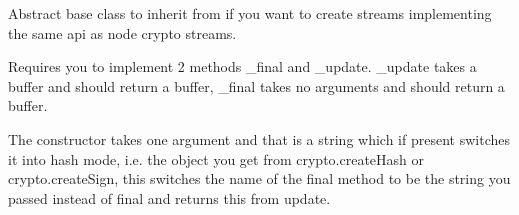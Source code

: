 \href{https://travis-ci.org/crypto-browserify/cipher-base}{\tt }

Abstract base class to inherit from if you want to create streams implementing the same api as node crypto streams.

Requires you to implement 2 methods {\ttfamily \+\_\+final} and {\ttfamily \+\_\+update}. {\ttfamily \+\_\+update} takes a buffer and should return a buffer, {\ttfamily \+\_\+final} takes no arguments and should return a buffer.

The constructor takes one argument and that is a string which if present switches it into hash mode, i.\+e. the object you get from crypto.\+create\+Hash or crypto.\+create\+Sign, this switches the name of the final method to be the string you passed instead of {\ttfamily final} and returns {\ttfamily this} from update. 